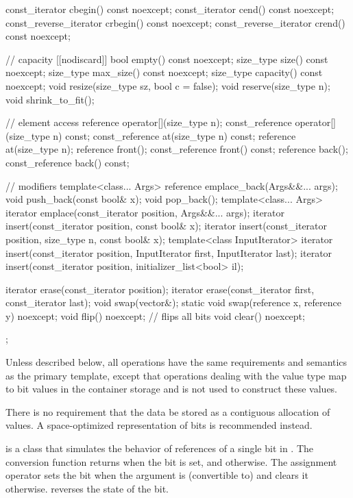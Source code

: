 \begin{codeblock}
{{    const_iterator         cbegin() const noexcept;
    const_iterator         cend() const noexcept;
    const_reverse_iterator crbegin() const noexcept;
    const_reverse_iterator crend() const noexcept;

    // capacity
    [[nodiscard]] bool empty() const noexcept;
    size_type size() const noexcept;
    size_type max_size() const noexcept;
    size_type capacity() const noexcept;
    void      resize(size_type sz, bool c = false);
    void      reserve(size_type n);
    void      shrink_to_fit();

    // element access
    reference       operator[](size_type n);
    const_reference operator[](size_type n) const;
    const_reference at(size_type n) const;
    reference       at(size_type n);
    reference       front();
    const_reference front() const;
    reference       back();
    const_reference back() const;

    // modifiers
    template<class... Args> reference emplace_back(Args&&... args);
    void push_back(const bool& x);
    void pop_back();
    template<class... Args> iterator emplace(const_iterator position, Args&&... args);
    iterator insert(const_iterator position, const bool& x);
    iterator insert(const_iterator position, size_type n, const bool& x);
    template<class InputIterator>
      iterator insert(const_iterator position, InputIterator first, InputIterator last);
    iterator insert(const_iterator position, initializer_list<bool> il);

    iterator erase(const_iterator position);
    iterator erase(const_iterator first, const_iterator last);
    void swap(vector&);
    static void swap(reference x, reference y) noexcept;
    void flip() noexcept;       // flips all bits
    void clear() noexcept;
  };
}
\end{codeblock}%

\pnum
Unless described below, all operations have the same requirements and
semantics as the primary  template, except that operations
dealing with the  value type map to bit values in the
container storage and
is not used to construct these values.

\pnum
There is no requirement that the data be stored as a contiguous allocation
of  values. A space-optimized representation of bits is
recommended instead.

\pnum
{}
is a class that simulates the behavior of references of a single bit in
. The conversion function returns 
when the bit is set, and  otherwise. The assignment operator
sets the bit when the argument is (convertible to)  and
clears it otherwise.  reverses the state of the bit.

